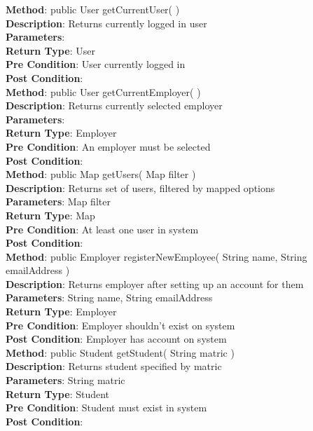 \documentclass{l3deliverable}
\begin{document}
\textbf{Method}: public User getCurrentUser( )\\
\textbf{Description}: Returns currently logged in user\\
\textbf{Parameters}:\\
\textbf{Return Type}: User\\
\textbf{Pre Condition}: User currently logged in\\
\textbf{Post Condition}:\\

\textbf{Method}: public User getCurrentEmployer( )\\
\textbf{Description}: Returns currently selected employer\\
\textbf{Parameters}:\\
\textbf{Return Type}: Employer\\
\textbf{Pre Condition}: An employer must be selected\\
\textbf{Post Condition}:\\

\textbf{Method}: public Map getUsers( Map filter )\\
\textbf{Description}: Returns set of users, filtered by mapped options\\
\textbf{Parameters}: Map filter\\
\textbf{Return Type}: Map\\
\textbf{Pre Condition}: At least one user in system\\
\textbf{Post Condition}:\\

\textbf{Method}: public Employer registerNewEmployee( String name, String emailAddress )\\
\textbf{Description}: Returns employer after setting up an account for them\\
\textbf{Parameters}: String name, String emailAddress\\
\textbf{Return Type}: Employer\\
\textbf{Pre Condition}: Employer shouldn't exist on system\\
\textbf{Post Condition}: Employer has account on system\\

\textbf{Method}: public Student getStudent( String matric )\\
\textbf{Description}: Returns student specified by matric\\
\textbf{Parameters}: String matric\\
\textbf{Return Type}: Student\\
\textbf{Pre Condition}: Student must exist in system\\
\textbf{Post Condition}:\\
\end{document}
